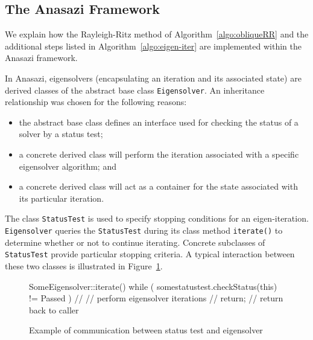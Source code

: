 \documentclass[acmtoms]{acmtrans2m}
\newcounter{algorithm}
\newcommand{\aspace}[1]{\texttt{#1}}
\begin{document}

\subsection{The Anasazi Framework}
\label{subsec:anasazi:solver_framework}

We explain how the Rayleigh-Ritz method of
Algorithm~\ref{algo:obliqueRR} and the additional steps listed in
Algorithm~\ref{algo:eigen-iter} are implemented within the Anasazi
framework.

In Anasazi, eigensolvers (encapsulating an iteration and its associated
state) are derived classes of the abstract base class
\aspace{Eigensolver}. An inheritance relationship was chosen for the following
reasons:
\begin{itemize}
  \item the abstract base class defines an interface used for checking the
    status of a solver by a status test;
  \item a concrete derived class will perform the iteration associated
    with a specific eigensolver algorithm; and
  \item a concrete derived class will act as a container for the state
    associated with its particular iteration.
\end{itemize}

The class \aspace{StatusTest} is used to specify stopping conditions for an
eigen-iteration. \aspace{Eigensolver} queries the \aspace{StatusTest} during its class
method \aspace{iterate()} to determine whether or not to continue iterating.  Concrete
subclasses of \aspace{StatusTest} provide particular stopping criteria. A typical
interaction between these two classes is illustrated in Figure~\ref{fig:comm}.

\begin{figure}[htb]
\begin{center}
\begin{boxedverbatim}
SomeEigensolver::iterate() {
  while ( somestatustest.checkStatus(this) != Passed ) {
    //
    // perform eigensolver iterations
    //
  }
  return;  // return back to caller
}
\end{boxedverbatim}
\end{center}
\caption{Example of communication between status test and eigensolver}
\label{fig:comm}
\end{figure}
\end{document}
